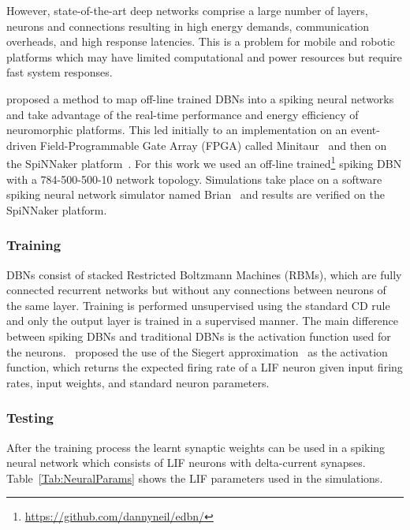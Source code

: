 \documentclass{frontiersENG} %
\begin{document}
However, state-of-the-art deep networks comprise a large number of layers, neurons and connections resulting in high energy demands, communication overheads, and high response latencies. This is a problem for mobile and robotic platforms which may have limited computational and power resources but require fast system responses. 


\citet{o2013real} proposed a method to map off-line trained DBNs into a spiking neural networks and take advantage of the real-time performance and energy efficiency of neuromorphic platforms. This led initially to an implementation on an event-driven Field-Programmable Gate Array (FPGA) called Minitaur~\citep{neil2014minitaur} and then on the SpiNNaker platform~\citep{Stromatias2015scalable}. For this work we used an off-line trained\footnote{\url{https://github.com/dannyneil/edbn/}} spiking DBN with a 784-500-500-10 network topology. Simulations take place on a software spiking neural network simulator named Brian~\citep{goodman2008brian} and results are verified on the SpiNNaker platform.

\subsubsection{Training}

DBNs consist of stacked Restricted Boltzmann Machines (RBMs), which are fully connected recurrent networks but without any connections between neurons of the same layer. Training is performed unsupervised using the standard CD rule~\citep{hinton2006fast} and only the output layer is trained in a supervised manner. The main difference between spiking DBNs and traditional DBNs is the activation function used for the neurons.~\cite{o2013real} proposed the use of the Siegert approximation~\citep{Jug_etal_2012} as the activation function, which returns the expected firing rate of a LIF neuron given input firing rates, input weights, and standard neuron parameters.

\subsubsection{Testing}
After the training process the learnt synaptic weights can be used in a spiking neural network which consists of LIF neurons with delta-current synapses. Table~\ref{Tab:NeuralParams} shows the LIF parameters used in the simulations.
\end{document}
